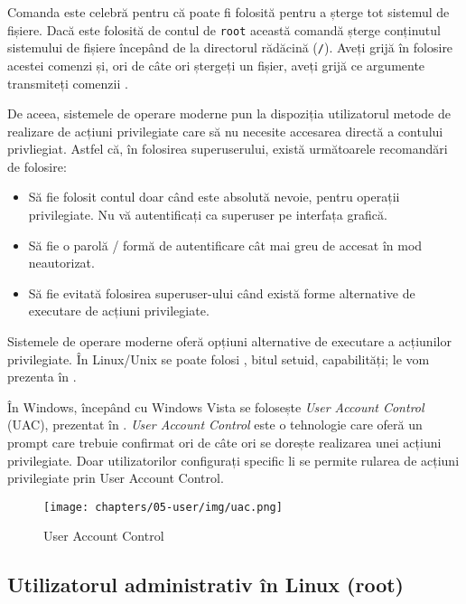 \begin{note}[Comanda rm -fr /]
  Comanda  este celebră pentru că poate fi folosită pentru a șterge tot sistemul de fișiere.
  Dacă este folosită de contul de \texttt{root} această comandă șterge conținutul sistemului de fișiere începând de la directorul rădăcină (\texttt{/}).
  Aveți grijă în folosire acestei comenzi și, ori de câte ori ștergeți un fișier, aveți grijă ce argumente transmiteți comenzii .
\end{note}

De aceea, sistemele de operare moderne pun la dispoziția utilizatorul metode de realizare de acțiuni privilegiate care să nu necesite accesarea directă a contului privliegiat.
Astfel că, în folosirea superuserului, există următoarele recomandări de folosire:

\begin{itemize}
  \item Să fie folosit contul doar când este absolută nevoie, pentru operații privilegiate.
    Nu vă autentificați ca superuser pe interfața grafică.
  \item Să fie o parolă / formă de autentificare cât mai greu de accesat în mod neautorizat.
  \item Să fie evitată folosirea superuser-ului când există forme alternative de executare de acțiuni privilegiate.
\end{itemize}

Sistemele de operare moderne oferă opțiuni alternative de executare a acțiunilor privilegiate.
În Linux/Unix se poate folosi , bitul setuid, capabilități;
le vom prezenta în .

În Windows, începând cu Windows Vista se folosește \textit{User Account Control} (UAC), prezentat în .
\textit{User Account Control} este o tehnologie care oferă un prompt care trebuie confirmat ori de câte ori se dorește realizarea unei acțiuni privilegiate.
Doar utilizatorilor configurați specific li se permite rularea de acțiuni privilegiate prin User Account Control.

\begin{figure}[!htbp]
  \centering
  \texttt{[image: chapters/05-user/img/uac.png]}
  \caption{User Account Control}
  \label{fig:user:uac}
\end{figure}

\subsection{Utilizatorul administrativ în Linux (root)}
\label{sec:user:root}

